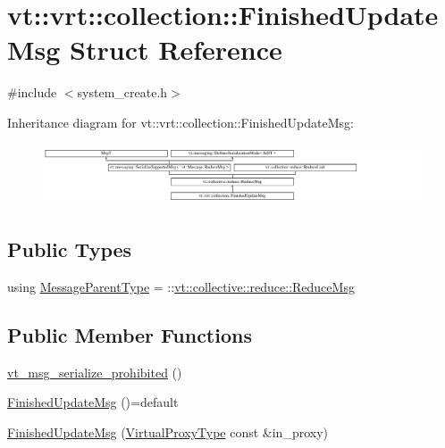 \hypertarget{structvt_1_1vrt_1_1collection_1_1_finished_update_msg}{}\section{vt\+:\+:vrt\+:\+:collection\+:\+:Finished\+Update\+Msg Struct Reference}
\label{structvt_1_1vrt_1_1collection_1_1_finished_update_msg}


{\ttfamily \#include $<$system\+\_\+create.\+h$>$}

Inheritance diagram for vt\+:\+:vrt\+:\+:collection\+:\+:Finished\+Update\+Msg\+:\begin{figure}[H]
\begin{center}
\leavevmode
\includegraphics[height=1.843621cm]{structvt_1_1vrt_1_1collection_1_1_finished_update_msg}
\end{center}
\end{figure}
\subsection*{Public Types}
\begin{DoxyCompactItemize}
\item 
using \hyperlink{structvt_1_1vrt_1_1collection_1_1_finished_update_msg_a0dc68be7527f1b664860af8d6b58f667}{Message\+Parent\+Type} = \+::\hyperlink{structvt_1_1collective_1_1reduce_1_1_reduce_msg}{vt\+::collective\+::reduce\+::\+Reduce\+Msg}
\end{DoxyCompactItemize}
\subsection*{Public Member Functions}
\begin{DoxyCompactItemize}
\item 
\hyperlink{structvt_1_1vrt_1_1collection_1_1_finished_update_msg_a689905fdefeb26dacfedba731a515077}{vt\+\_\+msg\+\_\+serialize\+\_\+prohibited} ()
\item 
\hyperlink{structvt_1_1vrt_1_1collection_1_1_finished_update_msg_a2388118a8c2f8b252df3b03a2fef2bdc}{Finished\+Update\+Msg} ()=default
\item 
\hyperlink{structvt_1_1vrt_1_1collection_1_1_finished_update_msg_a33f52bee58b70c60b29ef636118895a6}{Finished\+Update\+Msg} (\hyperlink{namespacevt_a1b417dd5d684f045bb58a0ede70045ac}{Virtual\+Proxy\+Type} const \&in\+\_\+proxy)
\end{DoxyCompactItemize}

